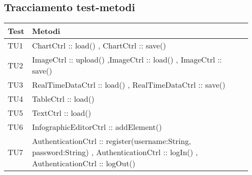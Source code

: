\subsection{Tracciamento test-metodi}
\begin{table}[h]
	\begin{center}
	\begin{tabular}{|l|p{}|p{}|c|}
	\toprule
		\textbf{Test}  & \textbf{Metodi}\\
		
	\midrule
		TU1 & ChartCtrl :: load() , ChartCtrl :: save() \\
	\midrule
		TU2 & ImageCtrl :: upload() ,ImageCtrl :: load() , ImageCtrl :: save() \\
	\midrule
		TU3 & RealTimeDataCtrl :: load() , RealTimeDataCtrl :: save() \\
	\midrule
		TU4 & TableCtrl :: load() \\
	\midrule
		TU5 &TextCtrl :: load() \\
	\midrule
		TU6 &InfographicEditorCtrl :: addElement() \\
	\midrule
		TU7 & AuthenticationCtrl :: register(username:String, password:String) , AuthenticationCtrl :: logIn() , AuthenticationCtrl :: logOut() \\
\bottomrule
\end{tabular}
\end{center}
\end{table}

